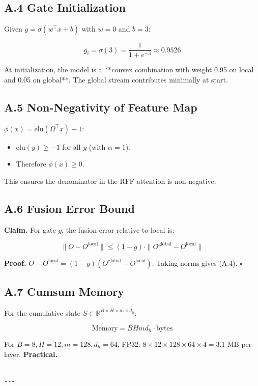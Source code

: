 \subsection{A.4 Gate Initialization}

Given $g = \sigma(w^\top x + b)$ with $w = 0$ and $b = 3$:

\[
g_i = \sigma(3) = \frac{1}{1 + e^{-3}} \approx 0.9526
\tag{A.3}
\]

At initialization, the model is a **convex combination with weight 0.95 on 
local and 0.05 on global**. The global stream contributes minimally at start.

\subsection{A.5 Non-Negativity of Feature Map}

$\phi(x) = \mathrm{elu}(\Omega^\top x) + 1$:

\begin{itemize}
\item $\mathrm{elu}(y) \geq -1$ for all $y$ (with $\alpha = 1$).
\item Therefore $\phi(x) \geq 0$.

\end{itemize}
This ensures the denominator in the RFF attention is non-negative.

\subsection{A.6 Fusion Error Bound}

\textbf{Claim.} For gate $g$, the fusion error relative to local is:

\[
\|O - O^\text{local}\| \leq (1 - g) \cdot \|O^\text{global} - O^\text{local}\|
\tag{A.4}
\]

\textbf{Proof.} $O - O^\text{local} = (1 - g)(O^\text{global} - O^\text{local})$. 
Taking norms gives (A.4). $\square$

\subsection{A.7 Cumsum Memory}

For the cumulative state $S \in \mathbb{R}^{B \times H \times m \times d_h}$:

\[
\text{Memory} = B H m d_h \cdot \text{bytes}
\tag{A.5}
\]

For $B=8, H=12, m=128, d_h=64$, FP32: $8 \times 12 \times 128 \times 64 \times 4 = 3.1$ MB per layer. \textbf{Practical.}
\begin{lstlisting}

---
\end{lstlisting}